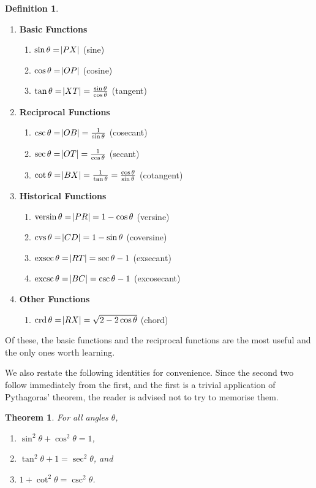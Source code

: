 \documentclass[a4paper,leqno]{article}
\numberwithin{equation}{section}
\newtheorem{thm}[equation]{Theorem}
\theoremstyle{definition}
\newtheorem{defn}[equation]{Definition}
\theoremstyle{remark}
\DeclareMathOperator{\versin}{versin}
\DeclareMathOperator{\cvs}{cvs}
\DeclareMathOperator{\exsec}{exsec}
\DeclareMathOperator{\excsc}{excsc}
\DeclareMathOperator{\crd}{crd}
\begin{document}
\begin{defn}\leavevmode
  \begin{enumerate}
    \item \textbf{Basic Functions}
      \begin{enumerate}
        \item $ \sin \theta = \abs{PX} $ (sine)
        \item $ \cos \theta = \abs{OP} $ (cosine)
        \item $ \tan \theta = \abs{XT} = \frac{\sin \theta}{\cos \theta} $ (tangent)
      \end{enumerate}
    \item \textbf{Reciprocal Functions}
      \begin{enumerate}
        \item $ \csc \theta = \abs{OB} = \frac{1}{\sin\theta} $ (cosecant)
        \item $ \sec \theta = \abs{OT} = \frac{1}{\cos\theta} $ (secant)
        \item $ \cot \theta = \abs{BX} = \frac{1}{\tan\theta} = \frac{\cos\theta}{\sin\theta} $ (cotangent)
      \end{enumerate}
    \item \textbf{Historical Functions}
      \begin{enumerate}
        \item $ \versin \theta = \abs{PR} = 1 - \cos \theta $ (versine)
        \item $ \cvs \theta = \abs{CD} = 1 - \sin \theta $ (coversine)
        \item $ \exsec \theta = \abs{RT} = \sec \theta - 1 $ (exsecant)
        \item $ \excsc \theta = \abs{BC} = \csc \theta - 1$ (excosecant)
      \end{enumerate}
    \item \textbf{Other Functions}
      \begin{enumerate}
        \item $ \crd \theta = \abs{RX} = \sqrt{2 - 2\cos \theta} $ (chord)
      \end{enumerate}
  \end{enumerate}
\end{defn}
Of these, the basic functions and the reciprocal functions are the most useful and
the only ones worth learning.

We also restate the following identities for convenience. Since the second two follow
immediately from the first, and the first is a trivial application of Pythagoras' theorem,
the reader is advised not to try to memorise them.
\begin{thm}
  For all angles $ \theta $,
  \begin{enumerate}
    \item $ \sin^2 \theta + \cos^2 \theta = 1 $,
    \item $ \tan^2 \theta + 1 = \sec^2 \theta $, and
    \item $ 1 + \cot^2 \theta = \csc^2 \theta $.
  \end{enumerate}
\end{thm}
\end{document}
